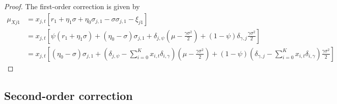 \documentclass[11pt,english]{article}
\begin{document}
\begin{proof}
The first-order correction is given by
\begin{align}
    \mu_{Xj1} &= x_{j,t} \left[ r_1 + \eta_1 \sigma + \eta_0 \sigma_{j,1} - \sigma \sigma_{j,1} - \xi_{j1}  \right] \nonumber\\
    &= x_{j,t} \left[ \psi (r_1 + \eta_1 \sigma )+ (\eta_0  - \sigma) \sigma_{j,1} +\delta_{j,\psi} \left(\mu - \frac{\gamma\sigma^2}{2}\right) +(1-\psi) \delta_{\gamma,j} \frac{\gamma\sigma^2}{2} \right] \nonumber\\
    &= x_{j,t} \left[  (\eta_0  - \sigma) \sigma_{j,1} +\left(\delta_{j,\psi} -\sum_{i=0}^K x_{i,t} \delta_{i,\gamma}\right)\left(\mu - \frac{\gamma\sigma^2}{2}\right) +(1-\psi) \left(\delta_{\gamma,j} - \sum_{i=0}^K x_{i,t} \delta_{i,\gamma} \right) \frac{\gamma\sigma^2}{2} \right]
\end{align}

\end{proof}

\subsection{Second-order correction}
\end{document}
